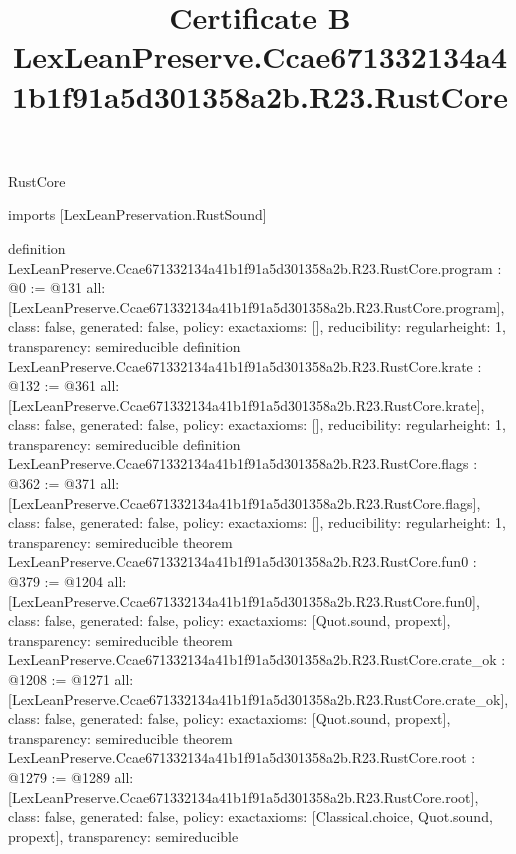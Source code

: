 \begin{lexlean}{RustCore}
\title{Certificate B LexLeanPreserve.Ccae671332134a41b1f91a5d301358a2b.R23.RustCore}
\begin{coremodule}
imports [LexLeanPreservation.RustSound]

definition LexLeanPreserve.Ccae671332134a41b1f91a5d301358a2b.R23.RustCore.program : @0 := @131 {
  all: [LexLeanPreserve.Ccae671332134a41b1f91a5d301358a2b.R23.RustCore.program],
  class: false,
  generated: false,
  policy: exact{axioms: []},
  reducibility: regular{height: 1},
  transparency: semireducible
}
definition LexLeanPreserve.Ccae671332134a41b1f91a5d301358a2b.R23.RustCore.krate : @132 := @361 {
  all: [LexLeanPreserve.Ccae671332134a41b1f91a5d301358a2b.R23.RustCore.krate],
  class: false,
  generated: false,
  policy: exact{axioms: []},
  reducibility: regular{height: 1},
  transparency: semireducible
}
definition LexLeanPreserve.Ccae671332134a41b1f91a5d301358a2b.R23.RustCore.flags : @362 := @371 {
  all: [LexLeanPreserve.Ccae671332134a41b1f91a5d301358a2b.R23.RustCore.flags],
  class: false,
  generated: false,
  policy: exact{axioms: []},
  reducibility: regular{height: 1},
  transparency: semireducible
}
theorem LexLeanPreserve.Ccae671332134a41b1f91a5d301358a2b.R23.RustCore.fun0 : @379 := @1204 {
  all: [LexLeanPreserve.Ccae671332134a41b1f91a5d301358a2b.R23.RustCore.fun0],
  class: false,
  generated: false,
  policy: exact{axioms: [Quot.sound, propext]},
  transparency: semireducible
}
theorem LexLeanPreserve.Ccae671332134a41b1f91a5d301358a2b.R23.RustCore.crate_ok : @1208 := @1271 {
  all: [LexLeanPreserve.Ccae671332134a41b1f91a5d301358a2b.R23.RustCore.crate_ok],
  class: false,
  generated: false,
  policy: exact{axioms: [Quot.sound, propext]},
  transparency: semireducible
}
theorem LexLeanPreserve.Ccae671332134a41b1f91a5d301358a2b.R23.RustCore.root : @1279 := @1289 {
  all: [LexLeanPreserve.Ccae671332134a41b1f91a5d301358a2b.R23.RustCore.root],
  class: false,
  generated: false,
  policy: exact{axioms: [Classical.choice, Quot.sound, propext]},
  transparency: semireducible
}


\end{coremodule}
\end{lexlean}
